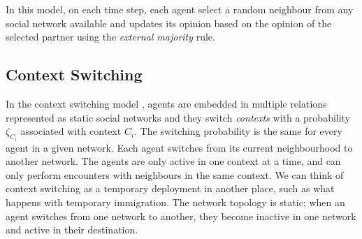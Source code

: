 \documentclass[preprint,number]{elsarticle}
\begin{document}
	In this model, on each time step, each agent select a random neighbour from any 
	social network available and updates its opinion based on the opinion of the selected partner using the \textit{external majority} rule. 
	
	
	\subsection{Context Switching}
	\label{sec:models_cs}
        \noindent In the context switching model \cite{Antunes2009}, agents are embedded in multiple
        relations represented as static social networks and they switch \textit{contexts} with a
        probability $\zeta_{C_i}$ associated with context $C_i$. The switching probability is the
        same for every agent in a given network.  Each agent switches from its current neighbourhood
        to another network. The agents are only active in one context at a time, and can only
        perform encounters with neighbours in the same context. We can think of context switching as
        a temporary deployment in another place, such as what happens with temporary
        immigration. The network topology is static; when an agent switches from one network to
        another, they become inactive in one network and active in their destination.
\end{document}
